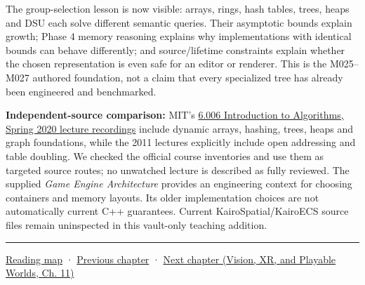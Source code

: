 The group-selection lesson is now visible: arrays, rings, hash tables, trees, heaps and DSU each solve different semantic queries. Their asymptotic bounds explain growth; Phase 4 memory reasoning explains why implementations with identical bounds can behave differently; and source/lifetime constraints explain whether the chosen representation is even safe for an editor or renderer. This is the M025--M027 authored foundation, not a claim that every specialized tree has already been engineered and benchmarked.

\textbf{Independent-source comparison:} MIT's \href{https://ocw.mit.edu/courses/6-006-introduction-to-algorithms-spring-2020/video_galleries/lecture-videos/}{6.006 Introduction to Algorithms, Spring 2020 lecture recordings} include dynamic arrays, hashing, trees, heaps and graph foundations, while the 2011 lectures explicitly include open addressing and table doubling. We checked the official course inventories and use them as targeted source routes; no unwatched lecture is described as fully reviewed. The supplied \emph{Game Engine Architecture} provides an engineering context for choosing containers and memory layouts. Its older implementation choices are not automatically current C++ guarantees. Current KairoSpatial/KairoECS source files remain uninspected in this vault-only teaching addition.

\begin{center}\rule{0.5\linewidth}{0.5pt}\end{center}

\hyperref[volume-reading-map]{Reading map} · \hyperref[05-engine-i-ch006-queries-lazy-ranges-allocators-and-module-boundaries]{Previous chapter} · \href{../07-Vision-XR-and-Playable-Worlds/main.pdf\#nameddest=05-engine-i-ch008-algorithms-application-boundaries-and-a-first-playable}{Next chapter (Vision, XR, and Playable Worlds, Ch. 11)}
